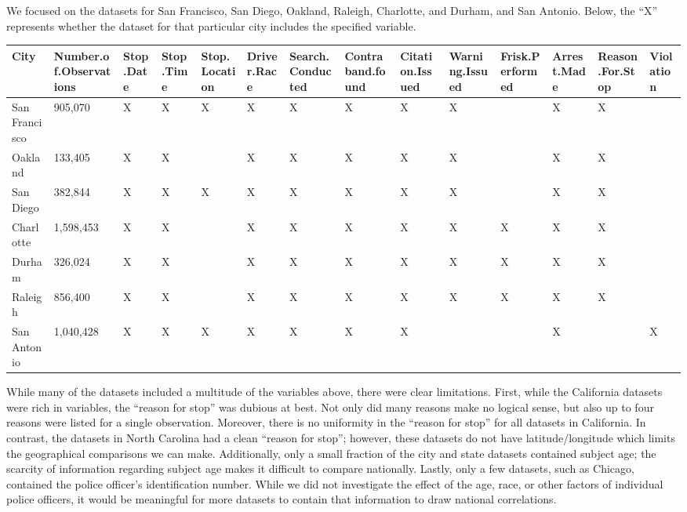 \documentclass[
]{book}
\begin{document}
\quad We focused on the datasets for San Francisco, San Diego, Oakland, Raleigh, Charlotte, and Durham, and San Antonio. Below, the ``X'' represents whether the dataset for that particular city includes the specified variable.

\begin{tabular}{l|l|l|l|l|l|l|l|l|l|l|l|l|l}
\hline
City & Number.of.Observations & Stop.Date & Stop.Time & Stop.Location & Driver.Race & Search.Conducted & Contraband.found & Citation.Issued & Warning.Issued & Frisk.Performed & Arrest.Made & Reason.For.Stop & Violation\\
\hline
San Francisco & 905,070 & X & X & X & X & X & X & X & X &  & X & X & \\
\hline
Oakland & 133,405 & X & X &  & X & X & X & X & X &  & X & X & \\
\hline
San Diego & 382,844 & X & X & X & X & X & X & X & X &  & X & X & \\
\hline
Charlotte & 1,598,453 & X & X &  & X & X & X & X & X & X & X & X & \\
\hline
Durham & 326,024 & X & X &  & X & X & X & X & X & X & X & X & \\
\hline
Raleigh & 856,400 & X & X &  & X & X & X & X & X & X & X & X & \\
\hline
San Antonio & 1,040,428 & X & X & X & X & X & X & X &  &  & X &  & X\\
\hline
\end{tabular}

\quad While many of the datasets included a multitude of the variables above, there were clear limitations. First, while the California datasets were rich in variables, the ``reason for stop'' was dubious at best. Not only did many reasons make no logical sense, but also up to four reasons were listed for a single observation. Moreover, there is no uniformity in the ``reason for stop'' for all datasets in California. In contrast, the datasets in North Carolina had a clean ``reason for stop''; however, these datasets do not have latitude/longitude which limits the geographical comparisons we can make. Additionally, only a small fraction of the city and state datasets contained subject age; the scarcity of information regarding subject age makes it difficult to compare nationally. Lastly, only a few datasets, such as Chicago, contained the police officer's identification number. While we did not investigate the effect of the age, race, or other factors of individual police officers, it would be meaningful for more datasets to contain that information to draw national correlations.
\end{document}
